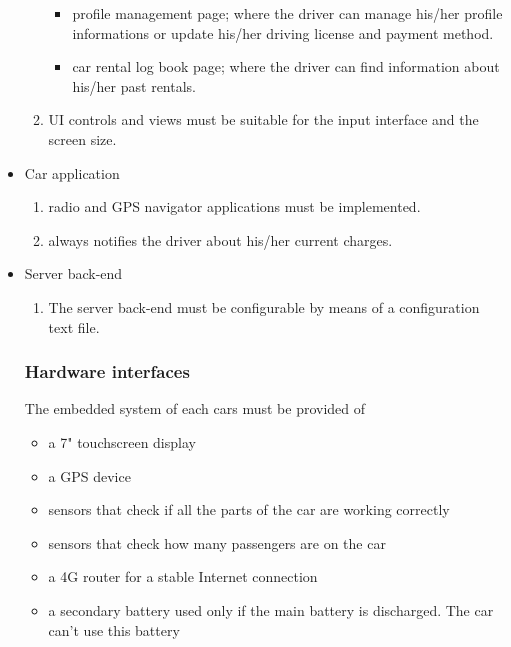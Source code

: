 \begin{itemize}
\begin{enumerate}
\begin{itemize}
					\item profile management page; where the driver can manage his/her profile informations or update his/her driving license and payment method.
					\item car rental log book page; where the driver can find information about his/her past rentals.
				\end{itemize}
			\item UI controls and views must be suitable for the input interface and the screen size.
		\end{enumerate}
	\item Car application
	\begin{enumerate}
		\item radio and GPS navigator applications must be implemented.
		\item always notifies the driver about his/her current charges.
	\end{enumerate}
	\item Server back-end
	\begin{enumerate}
		\item The server back-end must be configurable by means of a configuration text file.
	\end{enumerate}
	
\subsubsection{Hardware interfaces}
The embedded system of each cars must be provided of	
\begin{itemize}
	\item a 7" touchscreen display
	\item a GPS device
	\item sensors that check if all the parts of the car are working correctly
	\item sensors that check how many passengers are on the car
	\item a 4G router for a stable Internet connection
	\item a secondary battery used only if the main battery is discharged. The car can't use this battery
\end{itemize}


\end{itemize}
